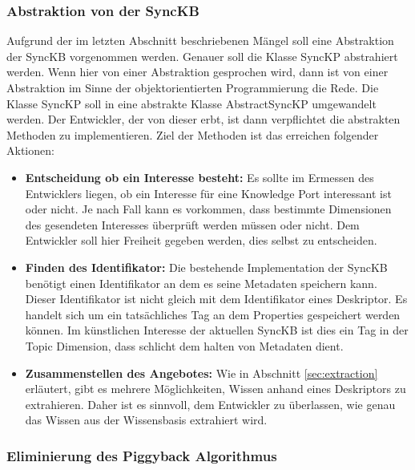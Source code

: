 \documentclass[a4paper]{article}
\begin{document}
	\subsubsection{Abstraktion von der SyncKB}
	\label{sec:sync_abstract}
	
	Aufgrund der im letzten Abschnitt beschriebenen Mängel soll eine Abstraktion der
	SyncKB vorgenommen werden. Genauer soll die Klasse SyncKP abstrahiert werden.
	Wenn hier von einer Abstraktion gesprochen wird, dann ist von einer Abstraktion 
	im Sinne der objektorientierten Programmierung die Rede.
	Die Klasse SyncKP soll in
	eine abstrakte Klasse AbstractSyncKP umgewandelt werden. Der Entwickler, der
	von dieser erbt, ist dann verpflichtet die abstrakten Methoden 
	zu implementieren. Ziel der Methoden ist das erreichen folgender Aktionen:
	
	\begin{itemize}
		\item \textbf{Entscheidung ob ein Interesse besteht:} Es sollte im 
		Ermessen des Entwicklers liegen, ob ein Interesse
		für eine Knowledge Port interessant ist oder nicht. Je nach Fall kann
		es vorkommen, dass bestimmte Dimensionen des gesendeten Interesses überprüft
		werden müssen oder nicht. Dem Entwickler soll hier Freiheit gegeben werden,
		dies selbst zu entscheiden.
		\item \textbf{Finden des Identifikator:} Die bestehende Implementation der
		SyncKB benötigt einen Identifikator an dem es seine Metadaten speichern
		kann. Dieser Identifikator ist nicht gleich mit dem Identifikator eines
		Deskriptor. Es handelt sich um ein tatsächliches Tag an dem Properties
		gespeichert werden können. Im künstlichen Interesse der aktuellen SyncKB
		ist dies ein Tag in der Topic Dimension, dass schlicht dem halten von
		Metadaten dient.
		\item \textbf{Zusammenstellen des Angebotes:} Wie in Abschnitt
		\ref{sec:extraction} erläutert, gibt es mehrere Möglichkeiten, Wissen
		anhand eines Deskriptors zu extrahieren. Daher ist es sinnvoll, dem
		Entwickler zu überlassen, wie genau das Wissen aus der Wissensbasis
		extrahiert wird. 
	\end{itemize} 	
	
	\subsubsection{Eliminierung des Piggyback Algorithmus}
	\label{sec:piggyback}
	
\end{document}

